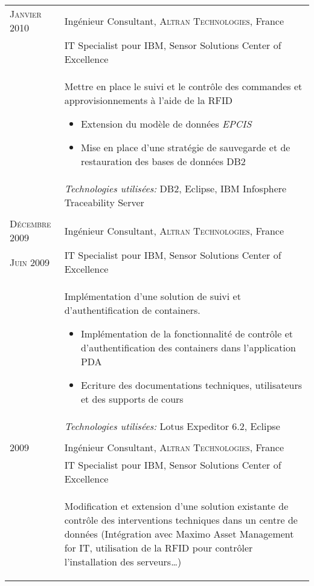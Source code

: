 \begin{longtable}{R{2.5cm}|p{14.8cm}}
 	\textsc{Janvier 2010} & Ingénieur Consultant, \textsc{Altran Technologies}, France\\
 	& IT Specialist pour IBM, Sensor Solutions Center of Excellence\\&
 	\footnotesize{
 	 	Mettre en place le suivi et le contrôle des commandes et approvisionnements à l'aide de la RFID
 		\begin{itemize}
			\item Extension du modèle de données \emph{EPCIS}
			\item Mise en place d'une stratégie de sauvegarde et de restauration des bases de données DB2
		\end{itemize}
		\vspace{-1em}
 	}\\&
 	\footnotesize{\emph{Technologies utilisées:} DB2, Eclipse, IBM Infosphere Traceability Server }\\
  \\
 	\textsc{Décembre 2009} & Ingénieur Consultant, \textsc{Altran Technologies}, France\\
 	\textsc{Juin 2009}& IT Specialist pour IBM, Sensor Solutions Center of Excellence\\&
 	\footnotesize{
 	 	Implémentation d'une solution de suivi et d'authentification de containers. 
 		\begin{itemize}
 		  	\item Implémentation de la fonctionnalité de contrôle et d'authentification des containers dans l'application PDA
			\item Ecriture des documentations techniques, utilisateurs et des supports de cours
		\end{itemize}
		\vspace{-1em}
 	}\\&
 \footnotesize{\emph{Technologies utilisées:} Lotus Expeditor 6.2, Eclipse }\\ 	
   \\
 	\textsc{2009} & Ingénieur Consultant, \textsc{Altran Technologies}, France\\
 	& IT Specialist pour IBM, Sensor Solutions Center of Excellence\\&
 	\footnotesize{
 	 	Modification et extension d'une solution existante de contrôle des interventions techniques dans un centre de données 
 	 	(Intégration avec Maximo Asset Management for IT, utilisation de la RFID pour contrôler l'installation des serveurs\ldots)
 		\begin{itemize}

\end{itemize}}
\end{longtable}
